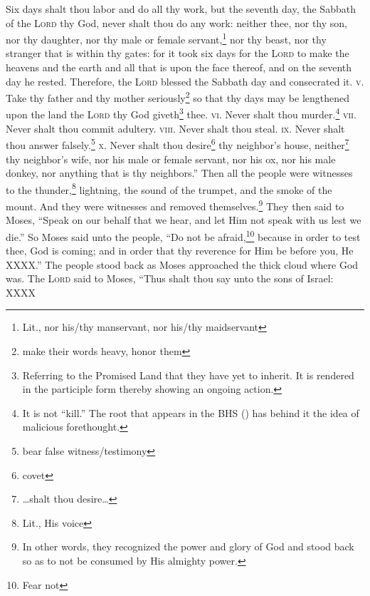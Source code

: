 \begin{enumerate}[align=center]
     Six days shalt thou labor and do all thy work,%
     but the seventh day, the Sabbath of the \textsc{Lord} thy God, never shalt thou do any work: neither thee, nor thy son, nor thy daughter, nor thy male or female servant,\footnote{Lit., nor his/thy manservant, nor his/thy maidservant} nor thy beast, nor thy stranger that is within thy gates:%
     for it took six days for the \textsc{Lord} to make the heavens and the earth and all that is upon the face thereof, and on the seventh day he rested. Therefore, the \textsc{Lord} blessed the Sabbath day and consecrated it.%
     \textsc{v.} Take thy father and thy mother seriously\footnote{make their words heavy, honor them} so that thy days may be lengthened upon the land the \textsc{Lord} thy God giveth\footnote{Referring to the Promised Land that they have yet to inherit. It is rendered in the participle form thereby showing an ongoing action.} thee.%
     \textsc{vi.} Never shalt thou murder.\footnote{It is not ``kill.'' The root that appears in the BHS () has behind it the idea of malicious forethought.}%
     \textsc{vii.} Never shalt thou commit adultery.%
     \textsc{viii.} Never shalt thou steal.%
     \textsc{ix.} Never shalt thou answer falsely.\footnote{bear false witness/testimony}%
     \textsc{x.} Never shalt thou desire\footnote{covet} thy neighbor's house, neither\footnote{\dots shalt thou desire\dots} thy neighbor's wife, nor his male or female servant, nor his ox, nor his male donkey, nor anything that is thy neighbors.''%
     Then all the people were witnesses to the thunder,\footnote{Lit., His voice} lightning, the sound of the trumpet, and the smoke of the mount. And they were witnesses and removed themselves.\footnote{In other words, they recognized the power and glory of God and stood back so as to not be consumed by His almighty power.}%
     They then said to Moses, ``Speak on our behalf that we hear, and let Him not speak with us lest we die.''%
     So Moses said unto the people, ``Do not be afraid,\footnote{Fear not} because in order to test thee, God is coming; and in order that thy reverence for Him be before you, He XXXX.''%
     The people stood back as Moses approached the thick cloud where God was.%
     The \textsc{Lord} said to Moses, ``Thus shalt thou say unto the sons of Israel: XXXX%

\end{enumerate}
